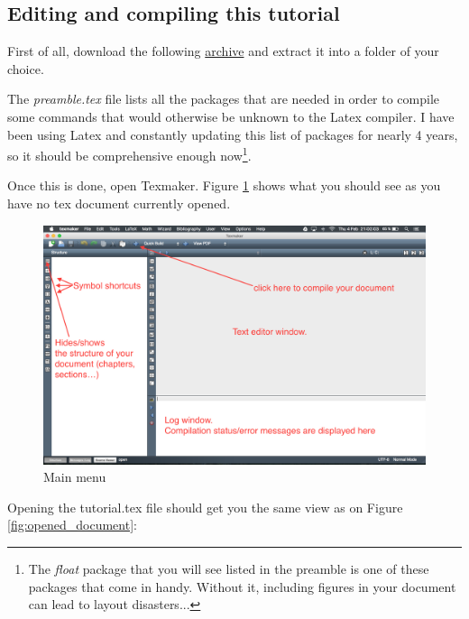 \documentclass{report}
\begin{document}
\subsection{Editing and compiling this tutorial}

First of all, download the following \href{https://drive.google.com/file/d/0Bzf79yzZcPJJNVhKNFBxWGs1aEE/view?usp=sharing}{archive} and extract it into a folder of your choice.

The \textit{preamble.tex} file lists all the packages that are needed in order to compile some commands that would otherwise be unknown to the Latex compiler. I have been using Latex and constantly updating this list of packages for nearly 4 years, so it should be comprehensive enough now\footnote{The \textit{float} package that you will see listed in the preamble is one of these packages that come in handy. Without it, including figures in your document can lead to layout disasters... }.

Once this is done, open Texmaker. Figure \ref{fig:texmaker_menu} shows what you should see as you have no tex document currently opened.

\begin{figure}[H]
\centering
\includegraphics[scale=0.38]{texmaker_menu}
\caption{Main menu}
\label{fig:texmaker_menu}
\end{figure}

Opening the tutorial.tex file should get you the same view as on Figure \ref{fig:opened_document}:
\end{document}
